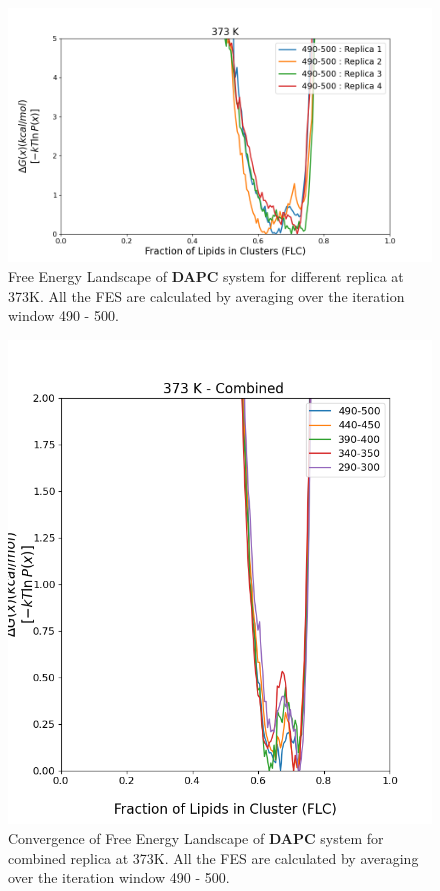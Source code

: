 \documentclass{biophys-new}
\begin{document}

\begin{figure}[hbt!]
\centering
\includegraphics[width=1.1\linewidth]{all_plots/ClusterLipids2Total/DPPC_DAPC_CHOL/373K/Average_DAPC_373_ClusterLipids2Total.png}
\caption{Free Energy Landscape of \textbf{DAPC} system for different replica at 373K. All the FES are calculated by averaging over the iteration window 490 - 500.}
\label{fig:view}

\end{figure}

\begin{figure}[hbt!]
\centering
\includegraphics[width=0.6\linewidth]{all_plots/ClusterLipids2Total/DPPC_DAPC_CHOL/373K/Convergence_DAPC_MULTI__373_ClusterLipids2Total.png}
\caption{Convergence of Free Energy Landscape of \textbf{DAPC} system for combined replica at 373K. All the FES are calculated by averaging over the iteration window 490 - 500.}
\label{fig:view}

\end{figure}
\end{document}
